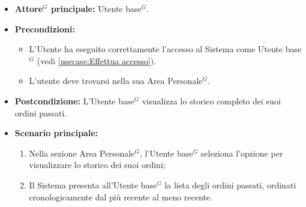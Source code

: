 \label{usecase:Storico ordini}
\begin{itemize}
	\item \textbf{\gls{Attore}$^G$ principale:} \gls{Utente base}$^G$.

	\item \textbf{Precondizioni:}
	      \begin{itemize}
		      \item L'Utente ha eseguito correttamente l'accesso al Sistema come \gls{Utente base}$^G$ (vedi \autoref{usecase:Effettua accesso}).
		      \item L'utente deve trovarsi nella sua Area Personale$^G$.
	      \end{itemize}

	\item \textbf{Postcondizione:} L'\gls{Utente base}$^G$ visualizza lo storico completo dei suoi ordini passati.

	\item \textbf{Scenario principale:}
	      \begin{enumerate}
		      \item Nella sezione Area Personale$^G$, l'\gls{Utente base}$^G$ seleziona l'opzione per visualizzare lo storico dei suoi ordini;
		      \item Il Sistema presenta all'\gls{Utente base}$^G$ la lista degli ordini passati, ordinati cronologicamente dal più recente al meno recente.
	      \end{enumerate}
\end{itemize}

